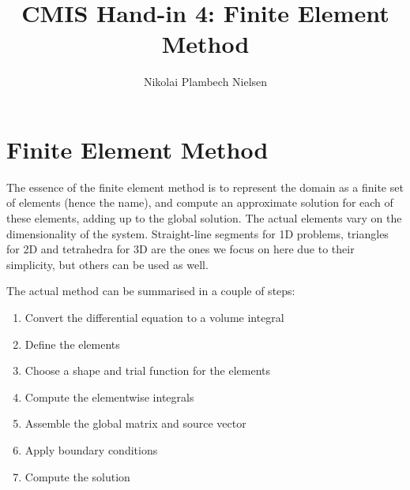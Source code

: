 \documentclass[sigconf]{acmart}
\begin{document}
%
\title{CMIS Hand-in 4: Finite Element Method}

\author{Nikolai Plambech Nielsen}


\maketitle

\section{Finite Element Method}
The essence of the finite element method is to represent the domain as a finite set of elements (hence the name), and compute an approximate solution for each of these elements, adding up to the global solution. The actual elements vary on the dimensionality of the system. Straight-line segments for 1D problems, triangles for 2D and tetrahedra for 3D are the ones we focus on here due to their simplicity, but others can be used as well.

The actual method can be summarised in a couple of steps:
\begin{enumerate}
	\item Convert the differential equation to a volume integral
	\item Define the elements
	\item Choose a shape and trial function for the elements
	\item Compute the elementwise integrals
	\item Assemble the global matrix and source vector
	\item Apply boundary conditions
	\item Compute the solution
\end{enumerate}
\end{document}
